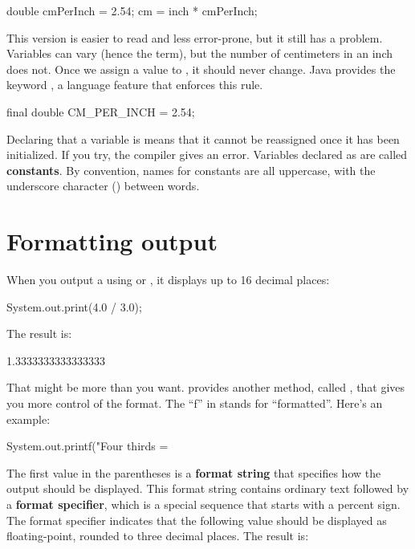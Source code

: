 \begin{code}
double cmPerInch = 2.54;
cm = inch * cmPerInch;
\end{code}

This version is easier to read and less error-prone, but it still has a problem.
Variables can vary (hence the term), but the number of centimeters in an inch does not.
Once we assign a value to , it should never change.
Java provides the keyword , a language feature that enforces this rule.

\begin{code}
final double CM_PER_INCH = 2.54;
\end{code}


Declaring that a variable is  means that it cannot be reassigned once it has been initialized.
If you try, the compiler gives an error.
Variables declared as  are called {\bf constants}.
By convention, names for constants are all uppercase, with the underscore character (\java{_}) between words.


\section{Formatting output}
\label{printf}

When you output a  using  or , it displays up to 16 decimal places:

\begin{code}
System.out.print(4.0 / 3.0);
\end{code}

The result is:

\begin{stdout}
1.3333333333333333
\end{stdout}


That might be more than you want.
 provides another method, called , that gives you more control of the format.
The ``f'' in  stands for ``formatted''.
Here's an example:

\begin{code}
System.out.printf("Four thirds = %
\end{code}


The first value in the parentheses is a {\bf format string} that specifies how the output should be displayed.
This format string contains ordinary text followed by a {\bf format specifier}, which is a special sequence that starts with a percent sign.
The format specifier  indicates that the following value should be displayed as floating-point, rounded to three decimal places.
The result is:

